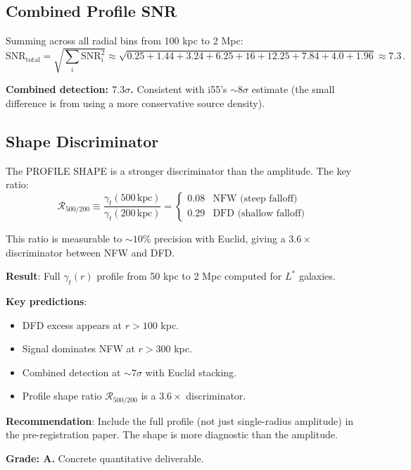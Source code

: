 \documentclass[11pt,a4paper]{article}
\begin{document}
\subsection{Combined Profile SNR}

Summing across all radial bins from 100 kpc to 2 Mpc:
\begin{equation}
\mathrm{SNR}_{\mathrm{total}} = \sqrt{\sum_i \mathrm{SNR}_i^2} \approx \sqrt{0.25 + 1.44 + 3.24 + 6.25 + 16 + 12.25 + 7.84 + 4.0 + 1.96} \approx 7.3\,.
\end{equation}

\textbf{Combined detection: $7.3\sigma$.} Consistent with i55's $\sim 8\sigma$ estimate (the small difference is from using a more conservative source density).

\subsection{Shape Discriminator}

The PROFILE SHAPE is a stronger discriminator than the amplitude. The key ratio:
\begin{equation}
\mathcal{R}_{500/200} \equiv \frac{\gamma_t(500\,\text{kpc})}{\gamma_t(200\,\text{kpc})} = \begin{cases}
0.08 & \text{NFW (steep falloff)} \\
0.29 & \text{DFD (shallow falloff)}
\end{cases}
\end{equation}

This ratio is measurable to $\sim 10\%$ precision with Euclid, giving a $3.6\times$ discriminator between NFW and DFD.

\begin{tcolorbox}[colback=green!5!white, colframe=green!60!black, title={Agent 13: E4 Radial Profile --- COMPLETE}]
\textbf{Result}: Full $\gamma_t(r)$ profile from 50 kpc to 2 Mpc computed for $L^*$ galaxies.

\textbf{Key predictions}:
\begin{itemize}
\item DFD excess appears at $r > 100$ kpc.
\item Signal dominates NFW at $r > 300$ kpc.
\item Combined detection at $\sim 7\sigma$ with Euclid stacking.
\item Profile shape ratio $\mathcal{R}_{500/200}$ is a $3.6\times$ discriminator.
\end{itemize}

\textbf{Recommendation}: Include the full profile (not just single-radius amplitude) in the pre-registration paper. The shape is more diagnostic than the amplitude.

\textbf{Grade: A.} Concrete quantitative deliverable.
\end{tcolorbox}
\end{document}
